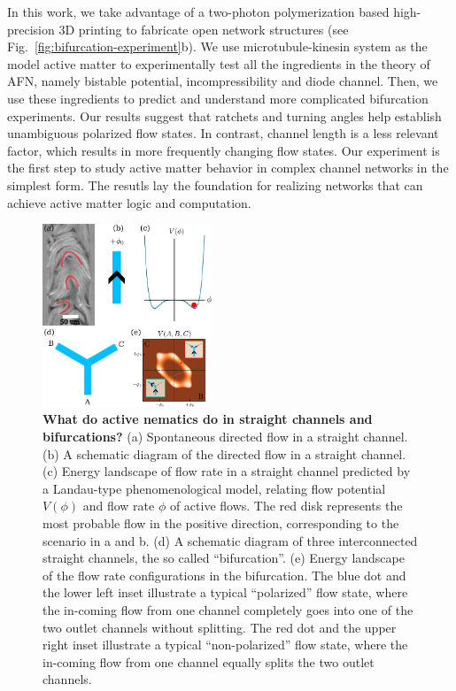 \documentclass[%
10pt,
superscriptaddress,
twocolumn,
 amsmath,amssymb,
 aps,prx,
]{revtex4-2}
\begin{document}
In this work, we take advantage of a two-photon polymerization based high-precision 3D printing to fabricate open network structures (see Fig.~\ref{fig:bifurcation-experiment}b). 
We use microtubule-kinesin system as the model active matter to experimentally test all the ingredients in the theory of AFN, namely bistable potential, incompressibility and diode channel. 
Then, we use these ingredients to predict and understand more complicated bifurcation experiments.
Our results suggest that ratchets and turning angles help establish unambiguous polarized flow states.
In contrast, channel length is a less relevant factor, which results in more frequently changing flow states.
Our experiment is the first step to study active matter behavior in complex channel networks in the simplest form.
The resutls lay the foundation for realizing networks that can achieve active matter logic and computation.

\begin{figure}[!h]
    \includegraphics[width=0.45\textwidth]{1-bifurcation-question}
    \caption{
    \textbf{What do active nematics do in straight channels and bifurcations?}
    (a) Spontaneous directed flow in a straight channel.
    (b) A schematic diagram of the directed flow in a straight channel.
    (c) Energy landscape of flow rate in a straight channel predicted by a Landau-type phenomenological model, relating flow potential $V(\phi)$ and flow rate $\phi$ of active flows. 
    The red disk represents the most probable flow in the positive direction, corresponding to the scenario in a and b.
    (d) A schematic diagram of three interconnected straight channels, the so called ``bifurcation''.
    (e) Energy landscape of the flow rate configurations in the bifurcation. 
    The blue dot and the lower left inset illustrate a typical ``polarized'' flow state, where the in-coming flow from one channel completely goes into one of the two outlet channels without splitting. 
    The red dot and the upper right inset illustrate a typical ``non-polarized'' flow state, where the in-coming flow from one channel equally splits the two outlet channels. 
    }
    \label{fig:bifurcation-question}
\end{figure}
\end{document}
